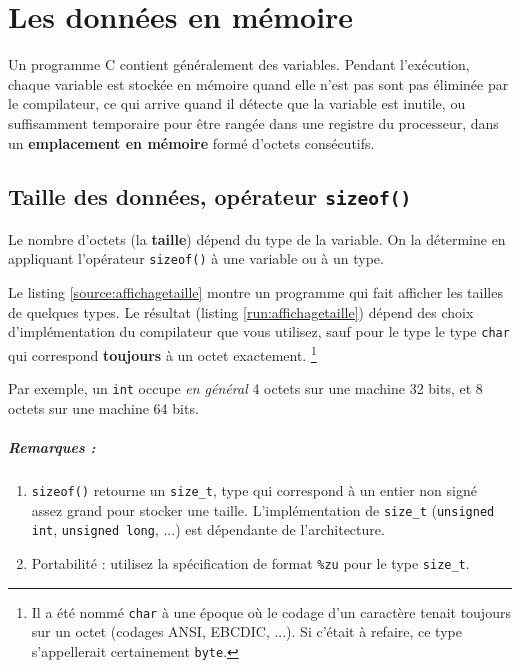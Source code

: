 \chapter{Les données en mémoire}


Un programme C contient généralement des variables.  Pendant
l'exécution, chaque variable est stockée en mémoire {quand elle n'est
  pas sont pas éliminée par le compilateur, ce qui arrive quand il
  détecte que la variable est inutile, ou suffisamment temporaire pour
  être rangée dans une registre du processeur}, dans un
\textbf{emplacement en mémoire} formé d'octets consécutifs.

\section{Taille des données, opérateur \texttt{sizeof()}}

Le nombre d'octets (la \textbf{taille}) dépend du type de la variable.
On la détermine en appliquant l'opérateur \texttt{sizeof()} à une variable
ou à un type.





Le listing \ref{source:affichagetaille} montre un programme qui fait
afficher les tailles de quelques types. Le résultat (listing
\ref{run:affichagetaille}) dépend des choix d'implémentation du
compilateur que vous utilisez, sauf pour le type le type \texttt{char}
qui correspond \textbf{toujours} à un octet exactement.
\footnote{Il a été nommé \texttt{char} à une époque où le codage d'un
  caractère tenait toujours sur un octet (codages ANSI, EBCDIC,
  ...). Si c'était à refaire, ce type s'appellerait certainement
  \texttt{byte}.}

Par exemple, un \texttt{int} occupe \emph{en général} 4 octets sur une
machine 32 bits, et 8 octets sur une machine 64 bits.



\paragraph{Remarques :} \begin{enumerate}
\item \texttt{sizeof()} retourne un \texttt{size\_t}, type qui
  correspond à un entier non signé assez grand pour stocker une
  taille. L'implémentation de \texttt{size\_t} (\texttt{unsigned int},
  \texttt{unsigned long}, ...) est dépendante de l'architecture.
\item Portabilité : utilisez la spécification de format \texttt{\%zu}
  pour le type \texttt{size\_t}.
  
\end{enumerate}

